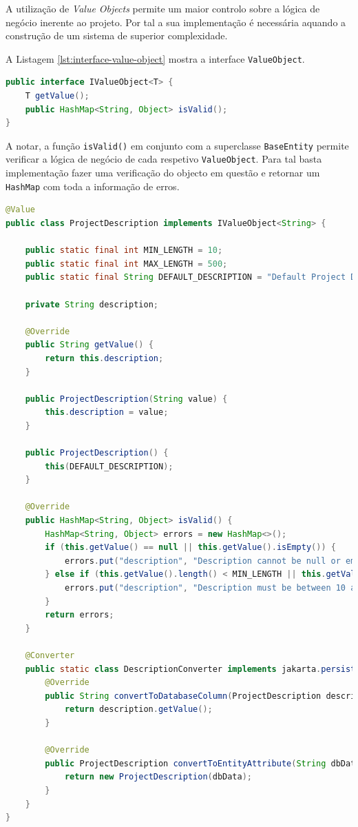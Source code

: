 A utilização de \textit{Value Objects} permite um maior controlo sobre a lógica de negócio inerente ao projeto. Por tal a sua implementação é necessária aquando a construção de um sistema de superior complexidade. 

A Listagem \ref{lst:interface-value-object} mostra a interface \lstinline|ValueObject|.

\begin{lstlisting}[language=Java,caption={Interface \textit{Value Object}},label={lst:interface-value-object}]
public interface IValueObject<T> {
    T getValue();
    public HashMap<String, Object> isValid();
}
\end{lstlisting}

A notar, a função \lstinline|isValid()| em conjunto com a superclasse \lstinline|BaseEntity| permite verificar a lógica de negócio de cada respetivo \lstinline|ValueObject|. Para tal basta implementação fazer uma verificação do objecto em questão e retornar um \lstinline|HashMap| com toda a informação de erros.

\begin{lstlisting}[language=Java,caption={Classe \textit{ProjectDescription}},label={lst:class-project-description}]
@Value
public class ProjectDescription implements IValueObject<String> {

    public static final int MIN_LENGTH = 10;
    public static final int MAX_LENGTH = 500;
    public static final String DEFAULT_DESCRIPTION = "Default Project Description";

    private String description;

    @Override
    public String getValue() {
        return this.description;
    }

    public ProjectDescription(String value) {
        this.description = value;
    }

    public ProjectDescription() {
        this(DEFAULT_DESCRIPTION);
    }

    @Override
    public HashMap<String, Object> isValid() {
        HashMap<String, Object> errors = new HashMap<>();
        if (this.getValue() == null || this.getValue().isEmpty()) {
            errors.put("description", "Description cannot be null or empty");
        } else if (this.getValue().length() < MIN_LENGTH || this.getValue().length() > MAX_LENGTH) {
            errors.put("description", "Description must be between 10 and 500 characters long");
        }
        return errors;
    }

    @Converter
    public static class DescriptionConverter implements jakarta.persistence.AttributeConverter<ProjectDescription, String> {
        @Override
        public String convertToDatabaseColumn(ProjectDescription description) {
            return description.getValue();
        }

        @Override
        public ProjectDescription convertToEntityAttribute(String dbData) {
            return new ProjectDescription(dbData);
        }
    }
}
\end{lstlisting}


